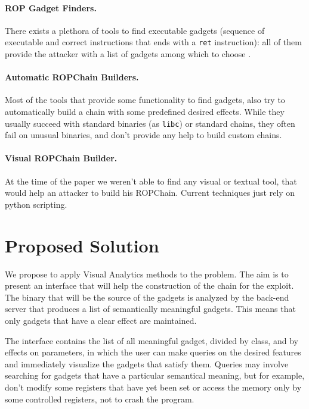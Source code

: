 \documentclass[twocolumn, 11pt]{article}
\begin{document}
\paragraph{ROP Gadget Finders.} There exists a plethora of tools to find executable gadgets (sequence of executable and correct instructions that ends with a {\tt ret} instruction): all of them provide the attacker with a list of gadgets among which to choose \cite{ropper} \cite{ROPGadget}.

\paragraph{Automatic ROPChain Builders.} Most of the tools that provide some functionality to find gadgets, also try to automatically build a chain with some predefined desired effects. While they usually succeed with standard binaries (as {\tt libc}) or standard chains, they often fail on unusual binaries, and don't provide any help to build custom chains.

\paragraph{Visual ROPChain Builder.} At the time of the paper we weren't able to find any visual or textual tool, that would help an attacker to build his ROPChain. Current techniques just rely on python scripting.

\section{Proposed Solution}

We propose to apply Visual Analytics methods to the problem. The aim is to present an interface that will help the construction of the chain for the exploit.
The binary that will be the source of the gadgets is analyzed by the back-end server that produces a list of semantically meaningful gadgets. This means that only gadgets that have a clear effect are maintained.

The interface contains the list of all meaningful gadget, divided by class, and by effects on parameters, in which the user can make queries on the desired features and immediately visualize the gadgets that satisfy them.
Queries may involve searching for gadgets that have a particular semantical meaning, but for example, don't modify some registers that have yet been set or access the memory only by some controlled registers, not to crash the program.
\end{document}
